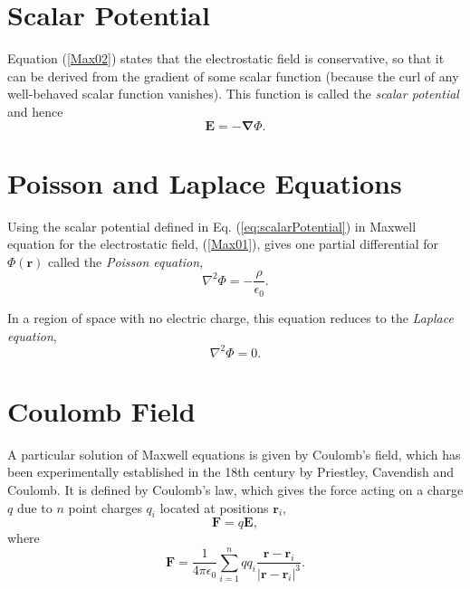 \section{Scalar Potential}

Equation (\ref{Max02}) states that the electrostatic field is conservative, so that it can be derived from  the gradient of some scalar function (because the curl of any well-behaved scalar function vanishes). This function is called the \textit{scalar potential} and hence
\begin{equation}
\textbf{E} = - \boldsymbol{\nabla} \Phi. \label{eq:scalarPotential}
\end{equation}


\section{Poisson and Laplace Equations}

Using the scalar potential defined in Eq. (\ref{eq:scalarPotential}) in Maxwell equation for the electrostatic field, (\ref{Max01}), gives one partial differential for $\Phi (\textbf{r})$ called the \textit{Poisson equation},
\begin{equation}
\nabla^2 \Phi = - \frac{\rho}{\epsilon_0}. \label{eq:PoissonEquation}
\end{equation}

In a region of space with no electric charge, this equation reduces to the \textit{Laplace equation},
\begin{equation}
\nabla^2 \Phi = 0. \label{eq:LaplaceEquation}
\end{equation}

\section{Coulomb Field}
A particular solution of Maxwell equations is given by  Coulomb's field, which has been experimentally established in the 18th century by Priestley, Cavendish and Coulomb. It is defined by Coulomb's law, which gives the force acting on a charge $q$ due to $n$ point charges $q_i$ located at positions $\textbf{r}_i$,
\begin{equation}
\textbf{F} = q \textbf{E},
\end{equation}
where 
\begin{equation}
\textbf{F} = \frac{1}{4\pi \epsilon_0}  \sum_{i=1}^n q q_i \frac{\textbf{r} - \textbf{r}_i}{\left| \textbf{r} - \textbf{r}_i \right| ^3}.
\end{equation}

